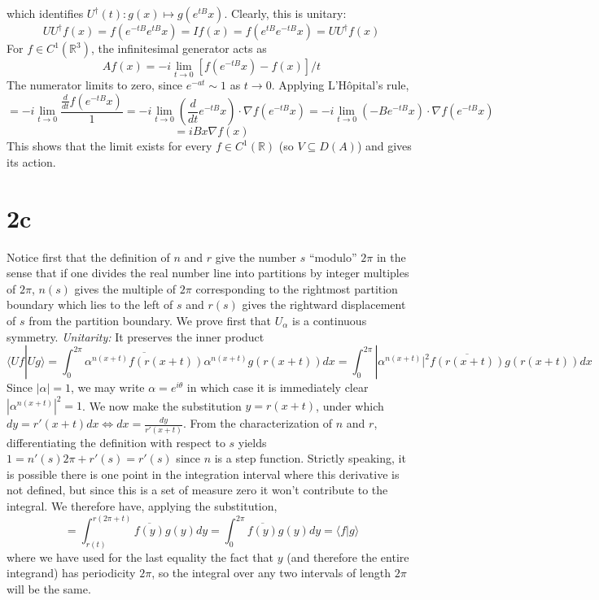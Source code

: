 \message{ !name(hw1.tex)}\documentclass{article}
\begin{document}
which identifies $U^{\dagger}(t): g(x)\mapsto g(e^{tB}x)$.
Clearly, this is unitary:
\[
  UU^{\dagger}f(x)=f(e^{-tB}e^{tB}x)=If(x)=f(e^{tB}e^{-tB}x)=UU^{\dagger}f(x)
\]
For $f\in C^{1}(\mathbb{R}^{3})$, the infinitesimal generator acts as
\[
  Af(x)=-i\lim_{t\to 0}[f(e^{-tB}x)-f(x)]/t
\]
The numerator limits to zero, since $e^{-at}\sim1$ as $t\to 0$.
Applying L'H\^opital's rule,
\[
  =-i\lim_{t\to 0}\frac{\frac{d}{dt}f(e^{-tB}x)}{1}
  =-i\lim_{t\to 0}\left( \frac{d}{dt}e^{-tB}x \right)\cdot\nabla f(e^{-tB}x)
  =-i\lim_{t\to 0}\left(-Be^{-tB}x\right)\cdot\nabla f(e^{-tB}x)
\]
\[
  =iBx\nabla f(x)
\]
This shows that the limit exists for every $f\in C^{1}(\mathbb{R})$ (so $V\subseteq D(A)$) and gives its action.

\section*{2c} %
Notice first that the definition of $n$ and $r$ give the number $s$ ``modulo'' $2\pi$ in the sense that if one divides the real number
line into partitions by integer multiples of $2\pi$, $n(s)$ gives the multiple of $2\pi$ corresponding to the rightmost partition boundary
which lies to the left of $s$ and $r(s)$ gives the rightward displacement of $s$ from the partition boundary.
We prove first that $U_{\alpha}$ is a continuous symmetry.\newline
\textit{Unitarity:}
It preserves the inner product
\[
  \langle Uf|Ug \rangle
  =\int_{0}^{2\pi}\overline{\alpha^{n(x+t)}f(r(x+t))}\alpha^{n(x+t)}g(r(x+t))dx
  =\int_{0}^{2\pi}|\alpha^{n(x+t)}|^{2}\overline{f(r(x+t))}g(r(x+t))dx
\]
Since $|\alpha|=1$, we may write $\alpha=e^{i\theta}$ in which case it is immediately clear $|\alpha^{n(x+t)}|^{2}=1$.
We now make the substitution $y=r(x+t)$, under which $dy=r'(x+t)dx\Leftrightarrow dx=\frac{dy}{r'(x+t)}$.
From the characterization of $n$ and $r$, differentiating the definition with respect to $s$ yields $1=n'(s)2\pi+r'(s)=r'(s)$
since $n$ is a step function.
Strictly speaking, it is possible there is one point in the integration interval where this derivative is not defined,
but since this is a set of measure zero it won't contribute to the integral.
We therefore have, applying the substitution,
\[
  =\int_{r(t)}^{r(2\pi+t)}\overline{f(y)}g(y)dy=\int_{0}^{2\pi}\overline{f(y)}g(y)dy=\langle f |g\rangle
\]
where we have used for the last equality the fact that $y$ (and therefore the entire integrand) has periodicity $2\pi$,
so the integral over any two intervals of length $2\pi$ will be the same.
\end{document}
